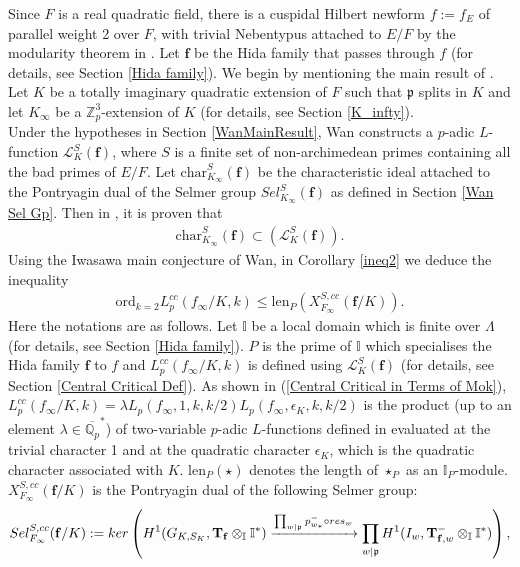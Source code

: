 \documentclass[reqno,10pt]{amsart}
\newcommand{\zp}{\mathbb{Z}_{p}}
\newcommand{\qp}{\mathbb{Q}_{p}}
\newcommand{\I}{\mathbb{I}}
\newcommand{\f}{\mathbf{f}}
\newcommand{\T}{\mathbf{T}}
\newcommand{\p}{\mathfrak{p}}
\newcommand{\ip}{\I_P}
\newcommand{\kinf}{K_\infty}
\theoremstyle{plain}
\theoremstyle{definition}
\begin{document}
Since $F$ is a  real quadratic field, there is a cuspidal Hilbert newform $f := f_E$ of parallel weight 2 over $F$, with trivial Nebentypus attached to $E/F$ by the modularity theorem in \cite{FLHS}. Let $\f$ be the Hida family that passes through $f$ (for details, see Section \ref{Hida family}).
We begin by mentioning the main result of \cite{Wan}. 
\\
Let $K$ be a totally imaginary quadratic extension of $F$ such that $\p$ splits in $K$ and let $K_\infty$ be a $\zp^3$-extension of $K$ (for details, see Section \ref{K_infty}).
\\
Under the hypotheses in Section \ref{WanMainResult}, Wan constructs a $p$-adic $L$-function $\mathcal{L}^S_K(\f)$, where $S$ is a finite set of non-archimedean primes containing all the bad primes of $E/F$. Let $ \mathrm{char}^S_{K_\infty}(\f)$ be the characteristic ideal attached to the Pontryagin dual of the Selmer group $Sel_{\kinf}^S(\f)$ as defined in Section \ref{Wan Sel Gp}. Then in \cite[Theorem 101]{Wan}, it is proven that
\begin{align*}
     \mathrm{char}^S_{K_\infty}(\f) \subset (\mathcal{L}^S_K(\f)).
\end{align*}
Using the Iwasawa main conjecture of Wan, in Corollary \ref{ineq2} we deduce the inequality
\begin{align} \label{introineq1}
    \mathrm{ord}_{k=2} L_p^{cc}(f_\infty/K,k) \leq \mathrm{len}_{P}(X_{F_\infty}^{S,cc}(\f/K)).
\end{align}
Here the notations are as follows. Let $\I$ be a local domain which is finite over $\Lambda$ (for details, see Section \ref{Hida family}). $P$ is the prime of $\I$ which specialises the Hida family $\f$ to $f$ and $L_p^{cc}(f_\infty/K,k)$ is defined using $\mathcal{L}_K^S(\f)$ (for details, see Section \ref{Central Critical Def}). As shown in (\ref{Central Critical in Terms of Mok}), $L_p^{cc}(f_\infty/K,k) = \lambda L_p(f_\infty,1,k,k/2) L_p(f_\infty,\epsilon_K,k,k/2)$ is the product (up to an element $\lambda \in \overline{\qp}^*$) of two-variable $p$-adic $L$-functions defined in \cite{MokExceptionalZero} evaluated at the trivial character 1 and at the quadratic character $\epsilon_K$, which is the quadratic character associated with $K$. $\mathrm{len}_P(\star)$ denotes the length of $\star_P$ as an $\ip$-module. $X_{F_\infty}^{S,cc}(\f/K)$ is the Pontryagin dual of the following Selmer group:
\begin{align*}
    Sel^{S,cc}_{F_\infty}(\f/K) := ker \left(H^1(G_{K,S_K},\T_\f \otimes_\I \I^*) \xrightarrow{\prod_{w|\p}p_{w_*}^-\circ \hspace{0.001 mm} res_w} \prod_{w|\p} H^1(I_w,\T_{\f,w}^- \otimes_\I \I^*) \right),
\end{align*}
\end{document}
